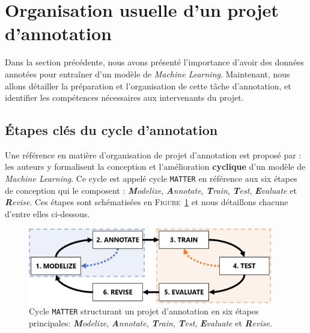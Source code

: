 \section{Organisation usuelle d'un projet d'annotation}
\label{section:2.2-ORGANISATION-ANNOTATION}
	
	Dans la section précédente, nous avons présenté l'importance d'avoir des données annotées pour entraîner d'un modèle de \textit{Machine Learning}.
	Maintenant, nous allons détailler la préparation et l'organisation de cette tâche d'annotation, et identifier les compétences nécessaires aux intervenants du projet.
	
	
	\subsection{Étapes clés du cycle d'annotation}
	\label{section:2.2.1-ORGANISATION-ANNOTATION-ETAPES-CLES}
		
		Une référence en matière d'organisation de projet d'annotation est proposé par \cite{pustejovsky-stubbs:2012:natural-language-annotation} : les auteurs y formalisent la conception et l'amélioration \textbf{cyclique} d'un modèle de \textit{Machine Learning}.
		Ce cycle est appelé cycle \texttt{MATTER} en référence aux six étapes de conception qui le composent : \textit{\textbf{M}odelize}, \textit{\textbf{A}nnotate}, \textit{\textbf{T}rain}, \textit{\textbf{T}est}, \textit{\textbf{E}valuate} et \textit{\textbf{R}evise}.
		Ces étapes sont schématisées en \textsc{Figure~\ref{figure:2.2.1-ORGANISATION-ANNOTATION-ETAPES-CLES-MATTER}} et nous détaillons chacune d'entre elles ci-dessous.
		\begin{figure}[!htb]
			\centering
			\includegraphics[width=0.95\textwidth]{figures/etatdelart-pustejovsky-2012-cycle-matter-mama-tt}
			\caption{
				Cycle \texttt{MATTER} structurant un projet d'annotation en six étapes principales: \textit{\textbf{M}odelize}, \textit{\textbf{A}nnotate}, \textit{\textbf{T}rain}, \textit{\textbf{T}est}, \textit{\textbf{E}valuate} et \textit{\textbf{R}evise}.
			}
			\label{figure:2.2.1-ORGANISATION-ANNOTATION-ETAPES-CLES-MATTER}
		\end{figure}
		
